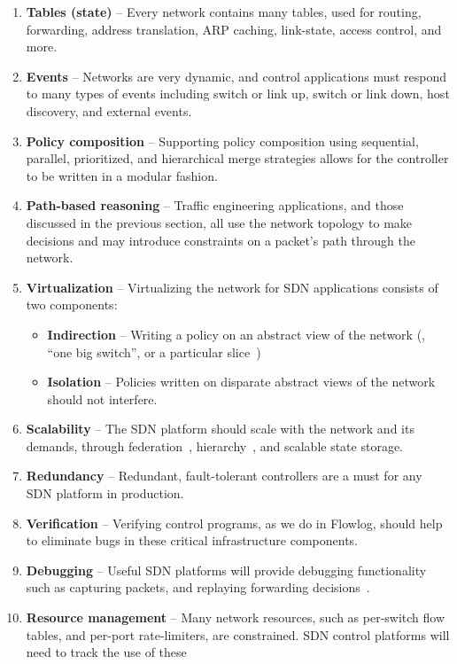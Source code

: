 \begin{enumerate}
\item {\bf Tables (state)} -- Every network contains many tables, used for routing, forwarding,
address translation, ARP caching, link-state, access control, and more.
\item {\bf Events} -- Networks are very dynamic, and control applications must respond to many
types of events including switch or link up, switch or link down, host discovery, and external events.
\item {\bf Policy composition} -- Supporting policy composition using sequential, parallel, prioritized,
and hierarchical merge strategies allows for the controller to be written in a modular fashion.
\item {\bf Path-based reasoning} -- Traffic engineering applications, and those discussed in the
previous section, all use the network topology to make decisions and may introduce constraints
on a packet's path through the network.
\item {\bf Virtualization} -- Virtualizing the network for SDN applications consists of two components:
	\begin{itemize}
	\item {\bf Indirection} -- Writing a policy on an abstract view of the network (\eg, ``one big switch'', or a particular slice~\cite{gutz:hotsdn12-slices})
	\item {\bf Isolation} -- Policies written on disparate abstract views of the network should not interfere.
	\end{itemize}
\item {\bf Scalability} -- The SDN platform should scale with the network and its demands, through
federation~\cite{Tootoonchian:2010}, hierarchy~\cite{kandoo,logical_xbars}, and scalable state storage.
\item {\bf Redundancy} -- Redundant, fault-tolerant controllers are a must for any SDN platform in production.
\item {\bf Verification} -- Verifying control programs, as we do in Flowlog, should help to eliminate
bugs in these critical infrastructure components.
\item {\bf Debugging} -- Useful SDN platforms will provide debugging functionality such as
capturing packets, and replaying forwarding decisions~\cite{packet_history, ofrewind}.
\item {\bf Resource management} -- Many network resources, such as per-switch flow tables,
and per-port rate-limiters, are constrained. SDN control platforms will need to track the use of these

\end{enumerate}
